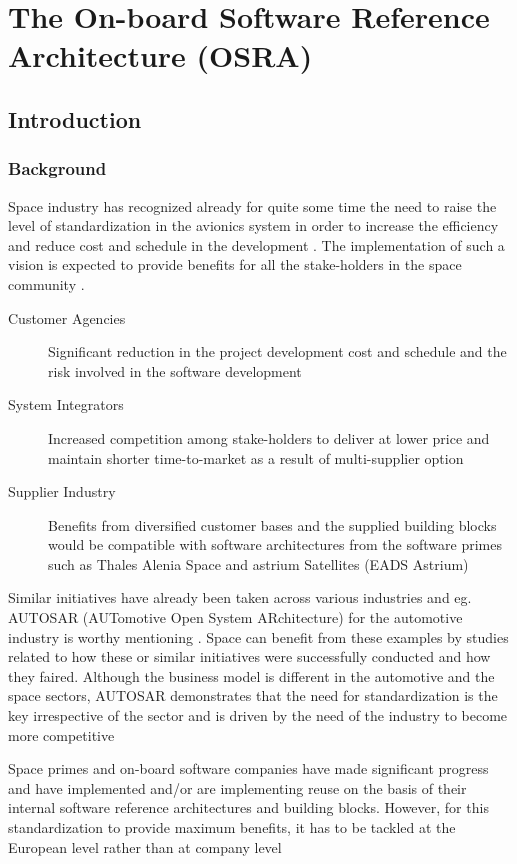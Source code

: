 
\chapter{The On-board Software Reference Architecture (OSRA)}
\label{chap:OSRA}
\section{Introduction}
\subsection{Background}
Space industry has recognized already for quite some time the need to raise the level of standardization in the avionics system in order to increase the efficiency and reduce cost and schedule in the development \cite{SAVOIR}.
The implementation of such a vision is expected to provide benefits for all the stake-holders in the space community \cite{SAVOIR}.

\begin{description}
\item  [Customer Agencies] Significant reduction in the project development cost and schedule and the risk involved in the software development
\item [System Integrators] Increased competition among stake-holders to deliver at lower price and maintain shorter time-to-market as a result of multi-supplier option
\item [Supplier Industry] Benefits from diversified customer bases and the supplied building blocks would be compatible with software architectures from the software primes such as Thales Alenia Space and astrium Satellites (EADS Astrium)
\end{description}

Similar initiatives have already been taken across various industries and eg. AUTOSAR (AUTomotive Open System ARchitecture) for the automotive industry is worthy mentioning \cite{BasConAUTOSAR}. Space can benefit from these examples by studies related to how these or similar initiatives were successfully conducted and how they faired. Although the business model is different in the automotive and the space sectors, AUTOSAR demonstrates that the need for standardization is the key irrespective of the sector and is driven by the need of the industry to become more competitive \cite{EfAnAUTOSAR}

Space primes and on-board software companies have made significant progress and have implemented and/or are implementing reuse on the basis of their internal software reference architectures and building blocks. However, for this standardization to provide maximum benefits, it has to be tackled at the European level rather than at company level \cite{SAVOIR}

